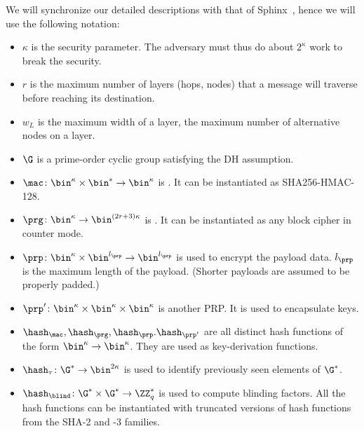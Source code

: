 We will synchronize our detailed descriptions with that of 
Sphinx~\cite{Sphinx}, hence we will use the following notation:
\begin{itemize}
  \item \(\kappa\) is the security parameter.
    The adversary must thus do about \(2^\kappa\) work to break the security.

  \item \(r\) is the maximum number of layers (hops, nodes) that a message will 
    traverse before reaching its destination.
  \item \(w_L\) is the maximum width of a layer, \ie the maximum 
    number of alternative nodes on a layer.

  \item \(\G\) is a prime-order cyclic group satisfying the \ac{DH} assumption.

  \item \(\mac\colon \bin^\kappa\times \bin^*\to \bin^\kappa\) is .
    It can be instantiated as \eg SHA256-HMAC-128.

  \item \(\prg\colon \bin^\kappa\to \bin^{(2r+3)\kappa}\) is .
    It can be instantiated as any block cipher in counter mode.

  \item \(\prp\colon \bin^\kappa\times \bin^{l_\prp} \to \bin^{l_\prp}\) is 
     used to encrypt the payload data.
    \(l_\prp\) is the maximum length of the payload.
    (Shorter payloads are assumed to be properly padded.)

  \item \(\prp'\colon \bin^\kappa\times \bin^\kappa\times \bin^\kappa\) is 
    another \ac{PRP}.
    It is used to encapsulate keys.

  \item \(\hash_\mac, \hash_\prg, \hash_\prp. \hash_{\prp'}\) are all distinct 
    hash functions of the form \(\bin^\kappa\to \bin^\kappa\).
    They are used as key-derivation functions.

  \item \(\hash_\tau\colon \G^*\to \bin^{2\kappa}\) is used to identify 
    previously seen elements of \(\G^*\).

  \item \(\hash_\blind\colon \G^*\times \G^*\to \ZZ_q^*\) is used to compute 
    blinding factors.
    All the hash functions can be instantiated with truncated versions of hash 
    functions from the SHA-2 and -3 families.


\end{itemize}
